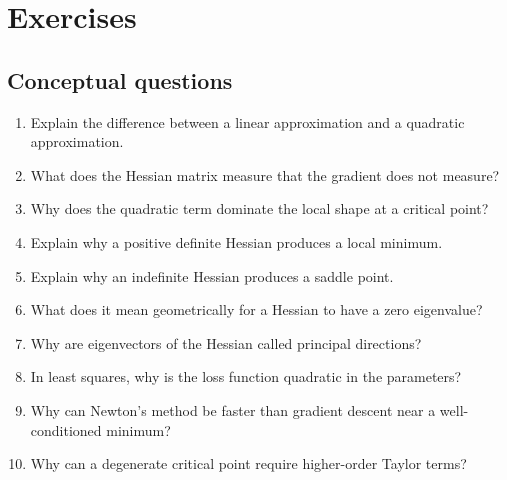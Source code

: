 \documentclass[11pt]{article}
\begin{document}
\section{Exercises}

\subsection*{Conceptual questions}
\begin{enumerate}
  \item Explain the difference between a linear approximation and a quadratic approximation.
  \item What does the Hessian matrix measure that the gradient does not measure?
  \item Why does the quadratic term dominate the local shape at a critical point?
  \item Explain why a positive definite Hessian produces a local minimum.
  \item Explain why an indefinite Hessian produces a saddle point.
  \item What does it mean geometrically for a Hessian to have a zero eigenvalue?
  \item Why are eigenvectors of the Hessian called principal directions?
  \item In least squares, why is the loss function quadratic in the parameters?
  \item Why can Newton's method be faster than gradient descent near a well-conditioned minimum?
  \item Why can a degenerate critical point require higher-order Taylor terms?
\end{enumerate}
\end{document}
